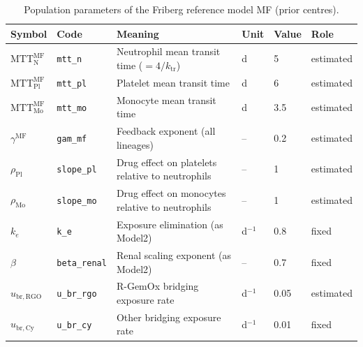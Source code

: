 \begin{table}[!htbp]
\centering
\footnotesize
\setlength{\tabcolsep}{3.5pt}
\caption{Population parameters of the Friberg reference model MF (prior centres).}
\label{tab:mf}
\begin{tabular}{ll>{\raggedright\arraybackslash}p{6cm}lll}
\toprule
Symbol & Code & Meaning & Unit & Value & Role \\
\midrule
$\mathrm{MTT}^{\mathrm{MF}}_{\mathrm{N}}$ & \texttt{mtt\_n} & Neutrophil mean transit time ($=4/k_{\mathrm{tr}}$) & d & 5 & estimated \\
$\mathrm{MTT}^{\mathrm{MF}}_{\mathrm{Pl}}$ & \texttt{mtt\_pl} & Platelet mean transit time & d & 6 & estimated \\
$\mathrm{MTT}^{\mathrm{MF}}_{\mathrm{Mo}}$ & \texttt{mtt\_mo} & Monocyte mean transit time & d & 3.5 & estimated \\
$\gamma^{\mathrm{MF}}$ & \texttt{gam\_mf} & Feedback exponent (all lineages) & -- & 0.2 & estimated \\
$\rho_{\mathrm{Pl}}$ & \texttt{slope\_pl} & Drug effect on platelets relative to neutrophils & -- & 1 & estimated \\
$\rho_{\mathrm{Mo}}$ & \texttt{slope\_mo} & Drug effect on monocytes relative to neutrophils & -- & 1 & estimated \\
$k_e$ & \texttt{k\_e} & Exposure elimination (as Model2) & d$^{-1}$ & 0.8 & fixed \\
$\beta$ & \texttt{beta\_renal} & Renal scaling exponent (as Model2) & -- & 0.7 & fixed \\
$u_{\mathrm{br,RGO}}$ & \texttt{u\_br\_rgo} & R-GemOx bridging exposure rate & d$^{-1}$ & 0.05 & estimated \\
$u_{\mathrm{br,Cy}}$ & \texttt{u\_br\_cy} & Other bridging exposure rate & d$^{-1}$ & 0.01 & fixed \\
\bottomrule
\end{tabular}
\end{table}
